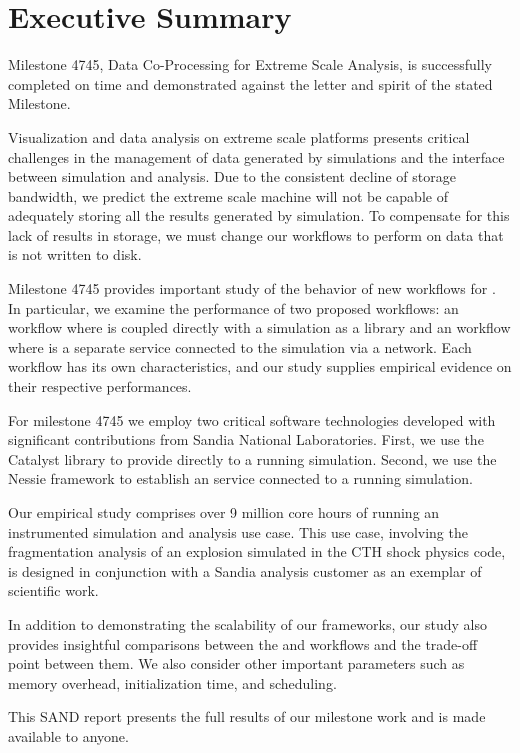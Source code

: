 \section*{Executive Summary}

Milestone 4745, Data Co-Processing for Extreme Scale Analysis, is
successfully completed on time and demonstrated against the letter and
spirit of the stated Milestone.

Visualization and data analysis on extreme scale platforms presents
critical challenges in the management of data generated by simulations and
the interface between simulation and analysis.  Due to the consistent
decline of storage bandwidth, we predict the extreme scale machine will not
be capable of adequately storing all the results generated by simulation.
To compensate for this lack of results in storage, we must change our
workflows to perform \vda on data that is not written to disk.

Milestone 4745 provides important study of the behavior of new workflows
for \vda.  In particular, we examine the performance of two proposed
workflows: an \insitu workflow where \vda is coupled directly with a
simulation as a library and an \intransit workflow where \vda is a separate
service connected to the simulation via a network.  Each workflow has its
own characteristics, and our study supplies empirical evidence on their
respective performances.

For milestone 4745 we employ two critical software technologies developed
with significant contributions from Sandia National Laboratories.  First,
we use the Catalyst library to provide \insitu \vda directly to a running
simulation.  Second, we use the Nessie framework to establish an \intransit
\vda service connected to a running simulation.

Our empirical study comprises over 9 million core hours of running an
instrumented simulation and analysis use case.  This use case, involving
the fragmentation analysis of an explosion simulated in the CTH shock
physics code, is designed in conjunction with a Sandia analysis customer as
an exemplar of scientific work.

In addition to demonstrating the scalability of our frameworks, our study
also provides insightful comparisons between the \insitu and \intransit
workflows and the trade-off point between them.  We also consider other
important parameters such as memory overhead, initialization time, and
scheduling.

This SAND report presents the full results of our milestone work and is
made available to anyone.
